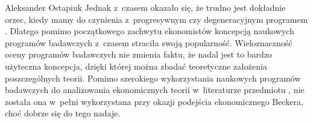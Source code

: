\begin{artplenv}{Aleksander Ostapiuk}
Jednak z~czasem okazało się, że trudno jest dokładnie orzec, kiedy mamy do czynienia z~progresywnym czy degeneracyjnym
programem
\parencite{marchi_appraising_1991,blaug_ugly_1997,hands_second_1990}.
Dlatego pomimo początkowego zachwytu ekonomistów
koncepcją naukowych programów badawczych z~czasem straciła swoją popularność. Wieloznaczność oceny programów badawczych nie zmienia
faktu, że nadal jest to bardzo użyteczna koncepcja, dzięki której można zbadać teoretyczne założenia poszczególnych
teorii. Pomimo szerokiego wykorzystania naukowych programów badawczych do analizowania ekonomicznych
teorii w~literaturze przedmiotu
\parencites[zob.][]{drakopoulos_review_2005}[s.~299–300]{hands_reflection_2001},
nie została
ona w~pełni wykorzystana przy okazji podejścia ekonomicznego Beckera, choć dobrze się do tego nadaje. 


\end{artplenv}

